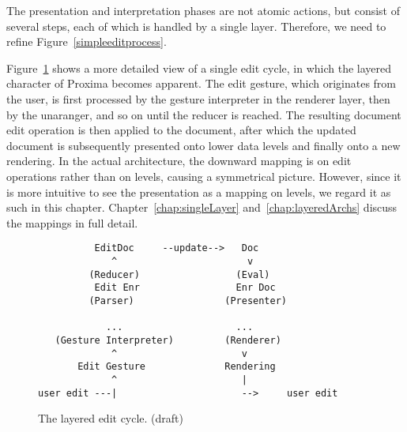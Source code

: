 The presentation and interpretation phases are not atomic actions, but consist of several steps, each of which is handled by a single layer. Therefore, we need to refine Figure~\ref{simpleeditprocess}. 

Figure~\ref{simplelayers} shows a more detailed view of a single edit cycle, in which the layered character of Proxima becomes apparent. The edit gesture, which originates from the user, is first processed by the gesture interpreter in the renderer layer, then by the unaranger, and so on until the reducer is reached. The resulting document edit operation is then applied to the document, after which the updated document is subsequently presented onto lower data levels and finally onto a new rendering. In the actual architecture, the downward mapping is on edit operations rather than on levels, causing a symmetrical picture. However, since it is more intuitive to see the presentation as a mapping on levels, we regard it as such in this chapter. Chapter~\ref{chap:singleLayer} and~\ref{chap:layeredArchs} discuss the mappings in full detail.

\begin{figure}
\begin{small}
\begin{center}
\begin{center}
\begin{scriptsize}
\begin{verbatim}
          EditDoc     --update-->   Doc       																																	  
             ^                       v
         (Reducer)                 (Eval)     																																	  
          Edit Enr                 Enr Doc    																																	  
         (Parser)                (Presenter)  																																	  
                                           																																	  
            ...                    ...       																																	  
   (Gesture Interpreter)         (Renderer)   																																	  
             ^                      v
       Edit Gesture              Rendering    																																	  
             ^                      |         																																	  
user edit ---|                      -->     user edit
\end{verbatim}
\end{scriptsize}
\end{center}\caption{The layered edit cycle. (draft)} \label{simplelayers} 
\end{center}
\end{small}
\end{figure}



